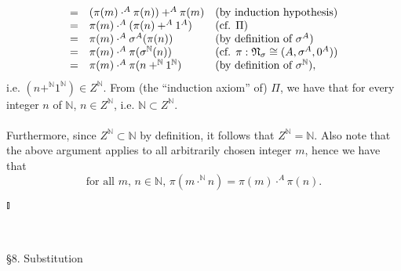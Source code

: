 \begin{enumerate}[1.]
\begin{enumerate}[(a)]
\begin{enumerate}[1)]
\[\begin{array}{lll}
= & (\pi(m) \cdot^A \pi(n)) +^A \pi(m) & \mbox{(by induction hypothesis)} \cr
= & \pi(m) \cdot^A (\pi(n) +^A 1^A) & \mbox{(cf. $\Pi$)} \cr
= & \pi(m) \cdot^A \sigma^A(\pi(n)) & \mbox{(by definition of $\sigma^A$)} \cr
= & \pi(m) \cdot^A \pi(\sigma^\mathbb{N}(n)) & \mbox{(cf. $\pi: \mathfrak{N}_\sigma \cong (A, \sigma^A, 0^A)$)} \cr
= & \pi(m) \cdot^A \pi(n +^\mathbb{N} 1^\mathbb{N}) & \mbox{(by definition of $\sigma^\mathbb{N}$)},
\end{array}
\]
i.e. $(n +^\mathbb{N} 1^\mathbb{N}) \in Z^\mathbb{N}$. From (the ``induction axiom'' of) $\Pi$, we have that for every integer $n$ of $\mathbb{N}$, $n \in Z^\mathbb{N}$, i.e. $\mathbb{N} \subset Z^\mathbb{N}$.\\
\\
Furthermore, since $Z^\mathbb{N} \subset \mathbb{N}$ by definition, it follows that $Z^\mathbb{N} = \mathbb{N}$. Also note that the above argument applies to all arbitrarily chosen integer $m$, hence we have that
\[
\mbox{for all $m$, $n \in \mathbb{N}$, $\pi(m \cdot^\mathbb{N} n) = \pi(m) \cdot^A \pi(n)$}.
\]
\end{enumerate}
\end{enumerate} \begin{flushright}$\talloblong$\end{flushright}
\end{enumerate}
\ 
\\
\\
{\large \S8. Substitution}
